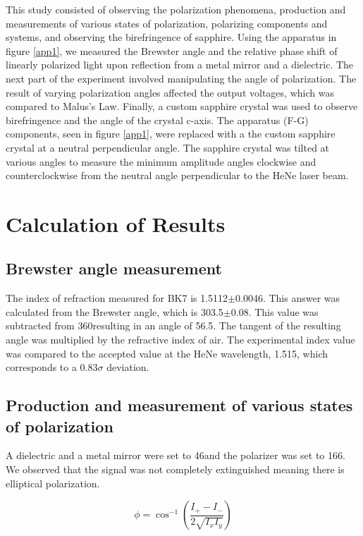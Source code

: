 \documentclass[aps,prl,twocolumn,superscriptaddress,nofootinbib]{revtex4-1}
\begin{document}
This study consisted of observing the polarization phenomena, production and measurements of various states of polarization, polarizing components and systems, and observing the birefringence of sapphire. Using the apparatus in figure \ref{app1}, we measured the Brewster angle and the relative phase shift of linearly polarized light upon reflection from a metal mirror and a dielectric. The next part of the experiment involved manipulating the angle of polarization. The result of varying polarization angles affected the output voltages, which was compared to Malus's Law. Finally, a custom sapphire crystal was used to observe birefringence and the angle of the crystal c-axis. The apparatus (F-G) components, seen in figure \ref{app1}, were replaced with a the custom sapphire crystal at a neutral perpendicular angle. The sapphire crystal was tilted at various angles to measure the minimum amplitude angles clockwise and counterclockwise from the neutral angle perpendicular to the HeNe laser beam.

\vfill\eject



\section{Calculation of Results}
\subsection{Brewster angle measurement}
The index of refraction measured for BK7 is 1.5112$\pm$0.0046. This answer was calculated from the Brewster angle, which is 303.5\degree$\pm$0.08\degree. This value was subtracted from 360\degree resulting in an angle of 56.5\degree. The tangent of the resulting angle was multiplied by the refractive index of air. The experimental index value was compared to the accepted value at the HeNe wavelength, 1.515, which corresponds to a 0.83$\sigma$ deviation.

\subsection{Production and measurement of various states of polarization}
A dielectric and a metal mirror were set to 46\degree and the polarizer was set to 166\degree. We observed that the signal was not completely extinguished meaning there is elliptical polarization.

\begin{equation}
\phi = \cos^{-1}\left(\frac{I_+-I_-}{2\sqrt{I_xI_y}}\right)
\label{phase}
\end{equation}
\end{document}
